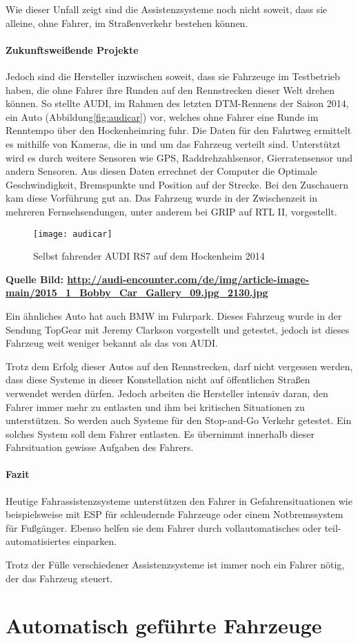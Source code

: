 Wie dieser Unfall zeigt sind die Assistenzsysteme noch nicht soweit, dass sie alleine, ohne Fahrer, im Straßenverkehr bestehen können. 

\paragraph{Zukunftsweißende Projekte} Jedoch sind die Hersteller inzwischen soweit, dass sie Fahrzeuge im Testbetrieb haben, die ohne Fahrer ihre Runden auf den Rennstrecken dieser Welt drehen können. So stellte AUDI, im Rahmen des letzten DTM-Rennens der Saison 2014, ein Auto (Abbildung\vref{fig:audicar}) vor, welches ohne Fahrer eine Runde im Renntempo über den Hockenheimring fuhr. Die Daten für den Fahrtweg ermittelt es mithilfe von Kameras, die in und um das Fahrzeug verteilt sind. Unterstützt wird es durch weitere Sensoren wie GPS, Raddrehzahlsensor, Gierratensensor und andern Sensoren. Aus diesen Daten errechnet der Computer die Optimale Geschwindigkeit, Bremspunkte und Position auf der Strecke. Bei den Zuschauern kam diese Vorführung gut an. Das Fahrzeug wurde in der Zwischenzeit in mehreren Fernsehsendungen, unter anderem bei GRIP auf RTL II, vorgestellt. 
\begin{figure}[htb]
\centering
\texttt{[image: audicar]}
\caption{Selbst fahrender AUDI RS7 auf dem Hockenheim 2014 }
\label{fig:audicar}
\end{figure}
\textbf{Quelle Bild: \url{ http://audi-encounter.com/de/img/article-image-main/2015_1_Bobby_Car_Gallery_09.jpg_2130.jpg}}


Ein ähnliches Auto hat auch BMW im Fuhrpark. Dieses Fahrzeug wurde in der Sendung TopGear mit Jeremy Clarkson vorgestellt und getestet, jedoch ist dieses Fahrzeug weit weniger bekannt als das von AUDI.

Trotz dem Erfolg dieser Autos auf den Rennstrecken, darf nicht vergessen werden, dass diese Systeme in dieser Konstellation nicht auf öffentlichen Straßen verwendet werden dürfen. Jedoch arbeiten die Hersteller intensiv daran, den Fahrer immer mehr zu entlasten und ihm bei kritischen Situationen zu unterstützen. So werden auch Systeme für den Stop-and-Go Verkehr getestet. Ein solches System soll dem Fahrer entlasten. Es übernimmt innerhalb dieser Fahrsituation gewisse Aufgaben des Fahrers.

\paragraph{Fazit} Heutige Fahrassistenzsysteme unterstützen den Fahrer in Gefahrensituationen wie beispielsweise mit ESP für schleudernde Fahrzeuge oder einem Notbremssystem für Fußgänger. Ebenso helfen sie dem Fahrer durch vollautomatisches oder teil-automatisiertes einparken. 

Trotz der Fülle verschiedener Assistenzsysteme ist  immer noch ein Fahrer nötig, der das Fahrzeug steuert. 




\section{Automatisch geführte Fahrzeuge}
